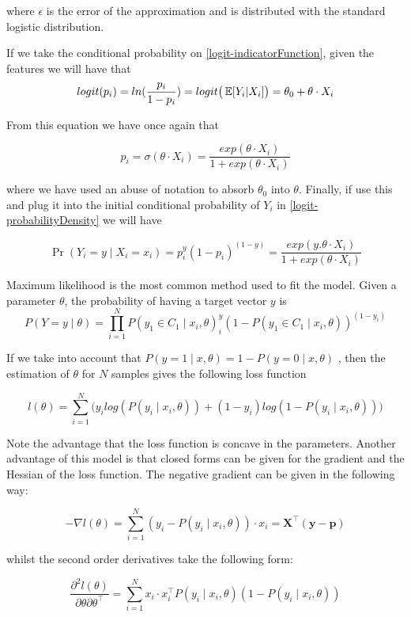 where $\epsilon$ is the error of the approximation and is distributed with the standard logistic distribution. %

If we take the conditional probability on \ref{logit-indicatorFunction}, given the features we will have that
$$logit(p_i)= ln(\frac{p_i}{1-p_i}) = logit\big( \operatorname{\mathbb{E}}[Y_i| X_i] \big) = \theta_0 + \theta \cdot X_i$$

From this equation we have once again that


$$p_i = \sigma(\theta \cdot X_i) = \frac{exp(\theta \cdot X_i) }{1 + exp(\theta \cdot X_i)}$$

where we have used an abuse of notation to absorb $\theta_0$ into $\theta$. Finally, if use this and plug it into the initial conditional probability of $Y_i$ in \ref{logit-probabilityDensity} we will have

$$  \Pr(Y_i=y \mid X_i = x_i) =  p_i^{y} (1-p_i)^{(1-y)} = \frac{exp(y . \theta \cdot X_i) }{1 + exp(\theta \cdot X_i)}$$


Maximum likelihood is the most common method used to fit the model. %
Given a parameter $\theta$, the probability of having a target vector $y$ is
\[
P(Y =y \mid \theta )  = \prod_{i=1}^N P(y_1 \in C_1 \mid x_i, \theta)^y_i(1 - P(y_1 \in C_1 \mid x_i, \theta) )^{(1-y_i)}
\]

If we take into account that $P(y=1 \mid x,\theta) = 1 - P(y=0 \mid x,\theta)$ , then the estimation of $\theta$ for $N$ samples gives the following loss function

\[
l(\theta) = \sum_{i=1}^N \big(y_i log(P(y_i \mid x_i,\theta)) + (1-y_i)log(1 - P(y_i \mid x_i,\theta) ) \big)
\]

Note the advantage that the loss function is concave in the parameters. Another advantage of this model is that closed forms can be given for the gradient and the Hessian of the loss function. The negative gradient can be given in the following way: %

\[
- \nabla  l(\theta) = \sum_{i=1}^N (y_i - P(y_i \mid x_i,\theta))\cdot x_i = \textbf{X}^{\intercal}(\textbf{y}-\textbf{p})
\]

whilst the second order derivatives take the following form:

\[
\frac{\partial^2 l(\theta)}{\partial \theta \partial \theta^\intercal} = \sum_{i=1}^N x_i \cdot x_i^\intercal P(y_i \mid x_i,\theta)(1 -P(y_i \mid x_i,\theta))
\]



